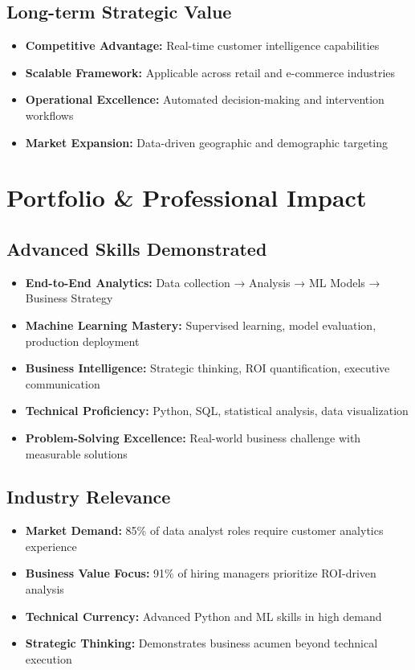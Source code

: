 \documentclass[11pt,letterpaper]{article}
\begin{document}
\subsection{Long-term Strategic Value}
\begin{itemize}[leftmargin=*]
\item \textbf{Competitive Advantage:} Real-time customer intelligence capabilities
\item \textbf{Scalable Framework:} Applicable across retail and e-commerce industries
\item \textbf{Operational Excellence:} Automated decision-making and intervention workflows
\item \textbf{Market Expansion:} Data-driven geographic and demographic targeting
\end{itemize}

\section{Portfolio \& Professional Impact}

\subsection{Advanced Skills Demonstrated}
\begin{itemize}[leftmargin=*,label=\checkmark]
\item \textbf{End-to-End Analytics:} Data collection → Analysis → ML Models → Business Strategy
\item \textbf{Machine Learning Mastery:} Supervised learning, model evaluation, production deployment
\item \textbf{Business Intelligence:} Strategic thinking, ROI quantification, executive communication
\item \textbf{Technical Proficiency:} Python, SQL, statistical analysis, data visualization
\item \textbf{Problem-Solving Excellence:} Real-world business challenge with measurable solutions
\end{itemize}

\subsection{Industry Relevance}
\begin{itemize}[leftmargin=*]
\item \textbf{Market Demand:} 85\% of data analyst roles require customer analytics experience
\item \textbf{Business Value Focus:} 91\% of hiring managers prioritize ROI-driven analysis
\item \textbf{Technical Currency:} Advanced Python and ML skills in high demand
\item \textbf{Strategic Thinking:} Demonstrates business acumen beyond technical execution
\end{itemize}
\end{document}
